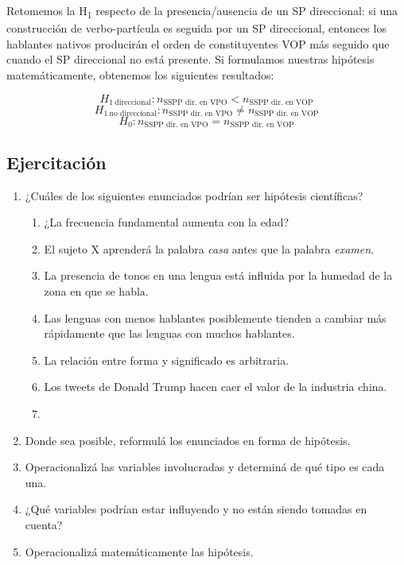 \documentclass[authoryear,a4paper, 14pt]{scrartcl}
\begin{document}
Retomemos la H\textsubscript{1} respecto de la
presencia/ausencia de un SP direccional: si una construcción de
verbo-partícula es seguida por un SP direccional, entonces los hablantes
nativos producirán el orden de constituyentes VOP más seguido que cuando
el SP direccional no está presente. Si formulamos nuestras hipótesis
matemáticamente, obtenemos los siguientes resultados:

\[H_{1~\textrm{direccional}}: n_{\textrm{SSPP dir. en VPO}} < n_{\textrm{SSPP dir. en VOP}}\]
\[H_{1~\textrm{no direccional}}: n_{\textrm{SSPP dir. en VPO}} \neq n_{\textrm{SSPP dir. en VOP}}\]
\[H_{0}: n_{\textrm{SSPP dir. en VPO}} =n_{\textrm{SSPP dir. en VOP}}\]

\hypertarget{ejercitacion-4}{%
\subsection{Ejercitación}\label{ejercitacion-4}}

\begin{enumerate}
    \item
      ¿Cuáles de los siguientes enunciados podrían ser hipótesis científicas?
      \begin{enumerate}
          \item
            ¿La frecuencia fundamental aumenta con la edad?
          \item
            El sujeto X aprenderá la palabra \emph{casa} antes que la palabra
            \emph{examen}.
          \item
            La presencia de tonos en una lengua está influida por la humedad de
            la zona en que se habla.
          \item
            Las lenguas con menos hablantes posiblemente tienden a cambiar más
            rápidamente que las lenguas con muchos hablantes.
          \item
            La relación entre forma y significado es arbitraria.
          \item
            Los tweets de Donald Trump hacen caer el valor de la industria china.
          \item
            
      \end{enumerate}
    \item
      Donde sea posible, reformulá los enunciados en forma de hipótesis.
    \item
      Operacionalizá las variables involucradas y determiná de qué tipo es
      cada una.
    \item
      ¿Qué variables podrían estar influyendo y no están siendo tomadas en cuenta?
     \item
      Operacionalizá matemáticamente las hipótesis.
\end{enumerate}
\end{document}
